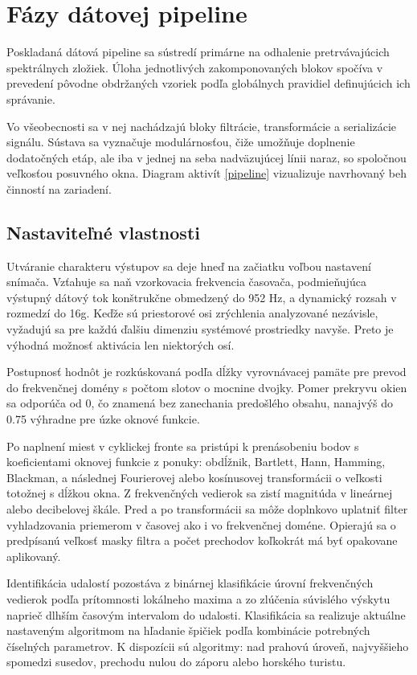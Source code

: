 \section{Fázy dátovej pipeline}
Poskladaná dátová pipeline sa sústredí primárne na odhalenie pretrvávajúcich spektrálnych zložiek. Úloha jednotlivých
zakomponovaných blokov spočíva v prevedení pôvodne obdržaných vzoriek podľa globálnych pravidiel definujúcich ich správanie.

Vo všeobecnosti sa v nej nachádzajú bloky filtrácie, transformácie a serializácie signálu. Sústava sa
vyznačuje modulárnosťou, čiže umožňuje doplnenie dodatočných etáp, ale iba v jednej na seba nadväzujúcej
línii naraz, so spoločnou veľkosťou posuvného okna. Diagram aktivít \ref{pipeline}
vizualizuje navrhovaný beh činností na zariadení.

\subsection{Nastaviteľné vlastnosti}
Utváranie charakteru výstupov sa deje hneď na začiatku voľbou nastavení snímača.
Vzťahuje sa naň vzorkovacia frekvencia časovača, podmieňujúca výstupný dátový tok konštrukčne obmedzený do 952 Hz,
a dynamický rozsah v rozmedzí do 16g. Keďže sú priestorové osi zrýchlenia analyzované nezávisle, vyžadujú sa pre každú ďalšiu
dimenziu systémové prostriedky navyše. Preto je výhodná možnosť aktivácia len niektorých osí.

Postupnosť hodnôt je rozkúskovaná podľa dĺžky vyrovnávacej pamäte pre prevod do frekvenčnej domény s počtom slotov
o mocnine dvojky. Pomer prekryvu okien sa odporúča od 0, čo znamená bez zanechania predošlého obsahu, nanajvýš
do 0.75 výhradne pre úzke oknové funkcie.

Po naplnení miest v cyklickej fronte sa pristúpi k prenásobeniu bodov s koeficientami oknovej funkcie
z ponuky: obdĺžnik, Bartlett, Hann, Hamming, Blackman, a následnej Fourierovej alebo kosínusovej transformácii
o veľkosti totožnej s dĺžkou okna. Z frekvenčných vedierok sa zistí magnitúda v lineárnej alebo decibelovej škále.
Pred a po transformácii sa môže doplnkovo uplatniť filter vyhladzovania priemerom v časovej ako i vo frekvenčnej doméne.
Opierajú sa o predpísanú veľkosť masky filtra a počet prechodov koľkokrát má byť opakovane aplikovaný.

Identifikácia udalostí pozostáva z binárnej klasifikácie úrovní frekvenčných vedierok podľa prítomnosti lokálneho maxima a
zo zlúčenia súvislého výskytu naprieč dlhším časovým intervalom do udalosti. Klasifikácia sa realizuje
aktuálne nastaveným algoritmom na hľadanie špičiek podľa kombinácie potrebných číselných parametrov. K dispozícii sú
algoritmy: nad prahovú úroveň, najvyššieho spomedzi susedov, prechodu nulou do záporu alebo horského turistu.

